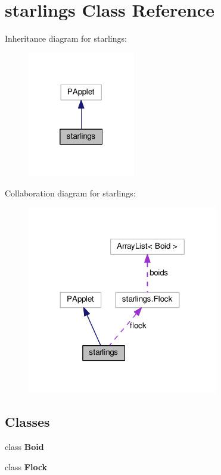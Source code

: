 \hypertarget{classstarlings}{}\section{starlings Class Reference}
\label{classstarlings}


Inheritance diagram for starlings\+:
\nopagebreak
\begin{figure}[H]
\begin{center}
\leavevmode
\includegraphics[width=133pt]{classstarlings__inherit__graph}
\end{center}
\end{figure}


Collaboration diagram for starlings\+:
\nopagebreak
\begin{figure}[H]
\begin{center}
\leavevmode
\includegraphics[width=236pt]{classstarlings__coll__graph}
\end{center}
\end{figure}
\subsection*{Classes}
\begin{DoxyCompactItemize}
\item 
class {\bfseries Boid}
\item 
class {\bfseries Flock}
\end{DoxyCompactItemize}
